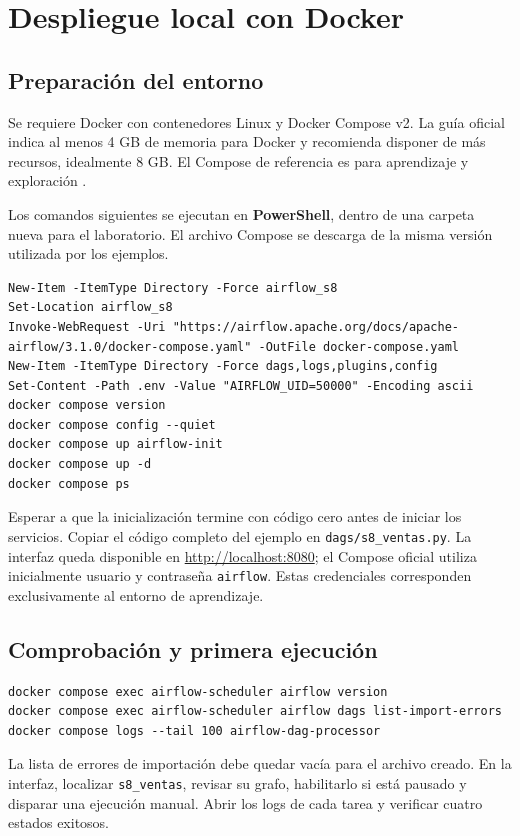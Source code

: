 \documentclass[12pt]{article}
\begin{document}
\section{Despliegue local con Docker}
\subsection{Preparación del entorno}
Se requiere Docker con contenedores Linux y Docker Compose v2. La guía oficial indica al menos 4 GB de memoria para Docker y recomienda disponer de más recursos, idealmente 8 GB. El Compose de referencia es para aprendizaje y exploración \cite{airflow_docker}.

Los comandos siguientes se ejecutan en \textbf{PowerShell}, dentro de una carpeta nueva para el laboratorio. El archivo Compose se descarga de la misma versión utilizada por los ejemplos.
\begin{lstlisting}[style=terminal,caption={Preparación en PowerShell}]
New-Item -ItemType Directory -Force airflow_s8
Set-Location airflow_s8
Invoke-WebRequest -Uri "https://airflow.apache.org/docs/apache-airflow/3.1.0/docker-compose.yaml" -OutFile docker-compose.yaml
New-Item -ItemType Directory -Force dags,logs,plugins,config
Set-Content -Path .env -Value "AIRFLOW_UID=50000" -Encoding ascii
docker compose version
docker compose config --quiet
docker compose up airflow-init
docker compose up -d
docker compose ps
\end{lstlisting}
Esperar a que la inicialización termine con código cero antes de iniciar los servicios. Copiar el código completo del ejemplo en \texttt{dags/s8\_ventas.py}. La interfaz queda disponible en \url{http://localhost:8080}; el Compose oficial utiliza inicialmente usuario y contraseña \texttt{airflow}. Estas credenciales corresponden exclusivamente al entorno de aprendizaje.

\subsection{Comprobación y primera ejecución}
\begin{lstlisting}[style=terminal]
docker compose exec airflow-scheduler airflow version
docker compose exec airflow-scheduler airflow dags list-import-errors
docker compose logs --tail 100 airflow-dag-processor
\end{lstlisting}
La lista de errores de importación debe quedar vacía para el archivo creado. En la interfaz, localizar \texttt{s8\_ventas}, revisar su grafo, habilitarlo si está pausado y disparar una ejecución manual. Abrir los logs de cada tarea y verificar cuatro estados exitosos.
\end{document}
